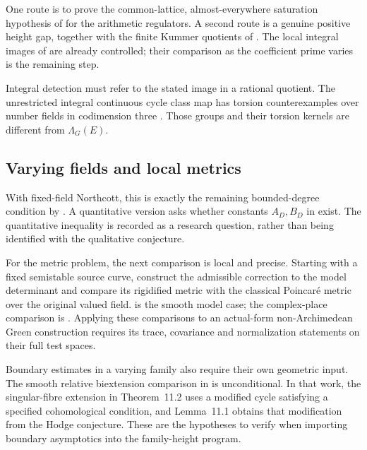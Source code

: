 One route is to prove the common-lattice, almost-everywhere
saturation hypothesis of  for the arithmetic
regulators. A second route is a genuine positive height gap,
together with the finite Kummer quotients of
. The local integral images of
 are already controlled; their comparison
as the coefficient prime varies is the remaining step.

Integral detection must refer to the stated image in a rational
quotient. The unrestricted integral continuous cycle class map
has torsion counterexamples over number fields in codimension
three \cite[Theorems~1.3--1.4]{ScaviaSuzuki}. Those groups and
their torsion kernels are different from \(\Lambda_G(E)\).

\subsection{Varying fields and local metrics}\label{sec:next-targets}


With fixed-field Northcott, this is exactly the remaining
bounded-degree condition by . A quantitative
version asks whether constants \(A_D,B_D\) in
 exist. The quantitative
inequality is recorded as a research question, rather than being
identified with the qualitative conjecture.

For the metric problem, the next comparison is local and precise.
Starting with a fixed semistable source curve, construct the
admissible correction to the model determinant and compare its
rigidified metric with the classical Poincaré metric over the
original valued field.  is the smooth
model case; the complex-place comparison is
. Applying these
comparisons to an actual-form non-Archimedean Green construction
requires its trace, covariance and normalization statements on
their full test spaces.

Boundary estimates in a varying family also require their own
geometric input. The smooth relative biextension comparison in
\cite[Theorem~10.9]{Nakayama} is unconditional. In that work,
the singular-fibre extension in Theorem~11.2 uses a modified cycle
satisfying a specified cohomological condition, and Lemma~11.1
obtains that modification from the Hodge conjecture. These are
the hypotheses to verify when importing boundary asymptotics
into the family-height program.
